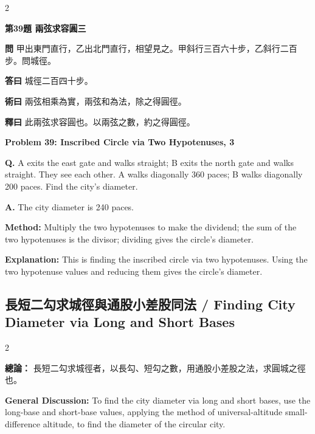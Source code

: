 \documentclass[11pt,a4paper]{article}
\newcommand{\wen}[1]{\noindent\textbf{問} #1\par\smallskip}
\newcommand{\da}[1]{\noindent\textbf{答曰} #1\par\smallskip}
\newcommand{\shu}[1]{\noindent\textbf{術曰} #1\par\smallskip}
\newcommand{\shi}[1]{\noindent\textbf{釋曰} #1\par\smallskip}
\newcommand{\wenE}[1]{\noindent\textbf{Q.} #1\par\smallskip}
\newcommand{\daE}[1]{\noindent\textbf{A.} #1\par\smallskip}
\newcommand{\shuE}[1]{\noindent\textbf{Method:} #1\par\smallskip}
\newcommand{\shiE}[1]{\noindent\textbf{Explanation:} #1\par\smallskip}
\begin{document}
\begin{paracol}{2}

\noindent\textbf{第39題 兩弦求容圓三}

\wen{甲出東門直行，乙出北門直行，相望見之。甲斜行三百六十步，乙斜行二百步。問城徑。}
\da{城徑二百四十步。}
\shu{兩弦相乘為實，兩弦和為法，除之得圓徑。}
\shi{此兩弦求容圓也。以兩弦之數，約之得圓徑。}

\switchcolumn

\noindent\textbf{Problem 39: Inscribed Circle via Two Hypotenuses, 3}

\wenE{A exits the east gate and walks straight; B exits the north gate and walks straight. They see each other. A walks diagonally 360 paces; B walks diagonally 200 paces. Find the city's diameter.}
\daE{The city diameter is 240 paces.}
\shuE{Multiply the two hypotenuses to make the dividend; the sum of the two hypotenuses is the divisor; dividing gives the circle's diameter.}
\shiE{This is finding the inscribed circle via two hypotenuses. Using the two hypotenuse values and reducing them gives the circle's diameter.}

\end{paracol}

\clearpage

\subsection*{長短二勾求城徑與通股小差股同法 / Finding City Diameter via Long and Short Bases}

\begin{paracol}{2}

\noindent\textbf{總論：} 長短二勾求城徑者，以長勾、短勾之數，用通股小差股之法，求圓城之徑也。

\switchcolumn

\noindent\textbf{General Discussion:} To find the city diameter via long and short bases, use the long-base and short-base values, applying the method of universal-altitude small-difference altitude, to find the diameter of the circular city.

\end{paracol}

\bigskip
\end{document}
